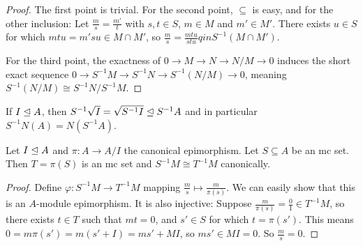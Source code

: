 \begin{proof}
  The first point is trivial.
  For the second point, $\subseteq$ is easy, and for the other inclusion:
  Let $\frac{m}{s} = \frac{m'}{t}$ with $s, t \in S$, $m \in M$ and $m' \in M'$.
  There exists $u \in S$ for which $mtu = m'su \in M \cap M'$, so $\frac{m}{s} =
  \frac{mtu}{stu} qin S^{-1}(M \cap M')$.

  For the third point, the exactness of $0 \to M \to N \to N/M \to 0$ induces
  the short exact sequence $0 \to S^{-1} M \to S^{-1} N \to S^{-1}(N/M) \to 0$,
  meaning $S^{-1} (N/M) \cong S^{-1}N / S^{-1}M$.
\end{proof}

\begin{remark}
  If $I \trianglelefteq A$, then $S^{-1} \sqrt{I} = \sqrt{S^{-1} I} \trianglelefteq S^{-1} A$ and
  in particular $S^{-1} N(A) = N(S^{-1} A)$.
\end{remark}

\begin{lemma}
  Let $I \trianglelefteq A$ and $\pi: A \to A/I$ the canonical epimorphism.
  Let $S \subseteq A$ be an mc set.
  Then $T = \pi(S)$ is an mc set and $S^{-1} M \cong T^{-1} M$ canonically.
\end{lemma}

\begin{proof}
  Define $\varphi: S^{-1} M \to T^{-1} M$ mapping $\frac{m}{s} \mapsto
  \frac{m}{\pi(s)}$.
  We can easily show that this is an $A$-module epimorphism.
  It is also injective:
  Suppose $\frac{m}{\pi(s)} = \frac{0}{1} \in T^{-1} M$, so there exists $t \in
  T$ such that $mt = 0$, and $s' \in S$ for which $t = \pi(s')$.
  This means $0 = m \pi(s') = m(s' + I) = ms' + MI$, so $ms' \in MI = 0$.
  So $\frac{m}{s} = 0$.
\end{proof}

